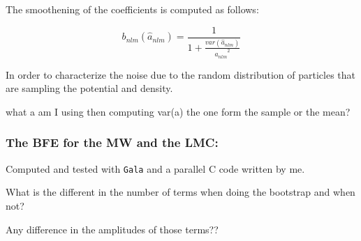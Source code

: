 \documentclass[14pt]{article}
\begin{document}
The smoothening of the coefficients is computed as follows:

\begin{equation}
  b_{nlm}(\hat{a}_{nlm}) = \dfrac{1}{1 +
  \frac{var(\hat{a}_{nlm})}{{\hat{a}_{nlm}}^2}}
\end{equation}

In order to characterize the noise due to the random distribution of particles
that are sampling the potential and density.



what a am I using then computing var(a) the one form the sample or the mean?

\subsubsection{The BFE for the MW and the LMC:}

Computed and tested with \verb+Gala+ and a parallel  C code written by me. 


What is the different in the number of terms when doing the bootstrap and when
not?

Any difference in the amplitudes of those terms??



\end{document}
